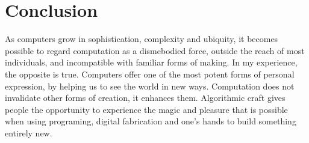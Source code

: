 \section{Conclusion}
	As computers grow in sophistication, complexity and ubiquity, it becomes possible to regard computation as a dismebodied force, outside the reach of most individuals, and incompatible with familiar forms of making. In my experience, the opposite is true. Computers offer one of the most potent forms of personal expression, by helping us to see the world in new ways. Computation does not invalidate other forms of creation, it enhances them. Algorithmic craft gives people the opportunity to experience the magic and pleasure that is possible when using programing, digital fabrication and one's hands to build something entirely new. 
	
	
	
	
	
	
	